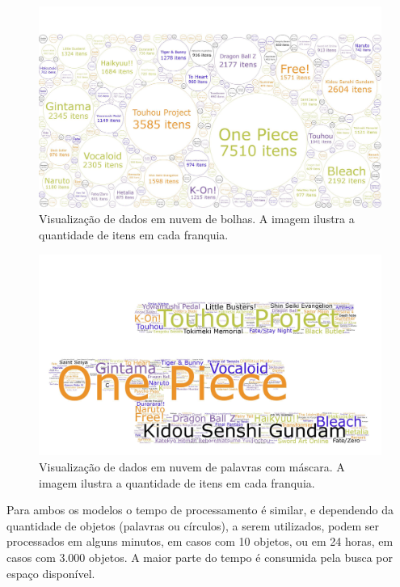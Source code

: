 \documentclass[12pt]{article}
\begin{document}
\begin{figure}[H]
\centering
\includegraphics[width=1\textwidth]{collection_amount_bubbles.pdf}
\caption{Visualização de dados em nuvem de bolhas. A imagem ilustra a quantidade de itens em cada franquia.} \label{collaborator}
\end{figure}

\begin{figure}[H]
\centering
\includegraphics[width=1\textwidth]{collection_amount_mask.pdf}
\caption{Visualização de dados em nuvem de palavras com máscara. A imagem ilustra a quantidade de itens em cada franquia.} \label{collaborator}
\end{figure}

Para ambos os modelos o tempo de processamento é similar, e dependendo da quantidade de objetos (palavras ou círculos), a serem utilizados, podem ser processados em alguns minutos, em casos com 10 objetos, ou em 24 horas, em casos com 3.000 objetos. A maior parte do tempo é consumida pela busca por espaço disponível.
\end{document}
